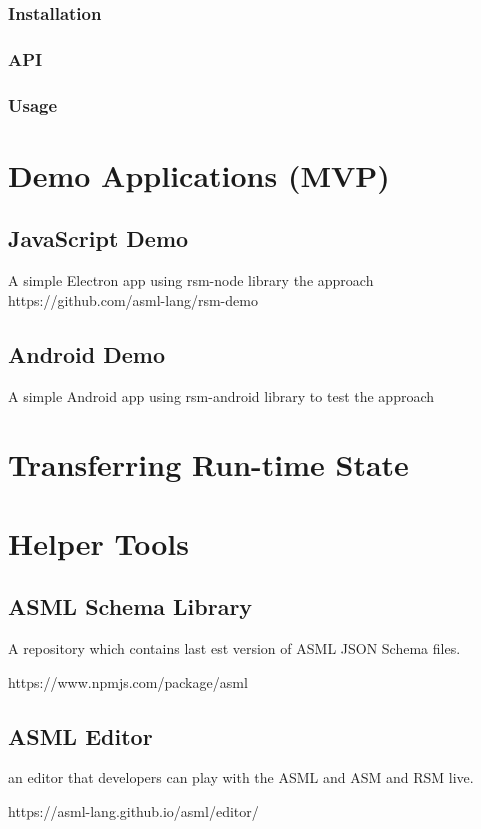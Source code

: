 \subsubsection{Installation}
\subsubsection{API}
\subsubsection{Usage}

\section{Demo Applications (MVP)}
\subsection{JavaScript Demo}
A simple Electron app using rsm-node library the approach
https://github.com/asml-lang/rsm-demo

\subsection{Android Demo}
A simple Android app using rsm-android library to test the approach

\section{Transferring Run-time State}


\section{Helper Tools}
\subsection{ASML Schema Library}
A repository which contains last est version of ASML JSON Schema files.

https://www.npmjs.com/package/asml

\subsection{ASML Editor}
an editor that developers can play with the ASML and ASM and RSM live.

https://asml-lang.github.io/asml/editor/

